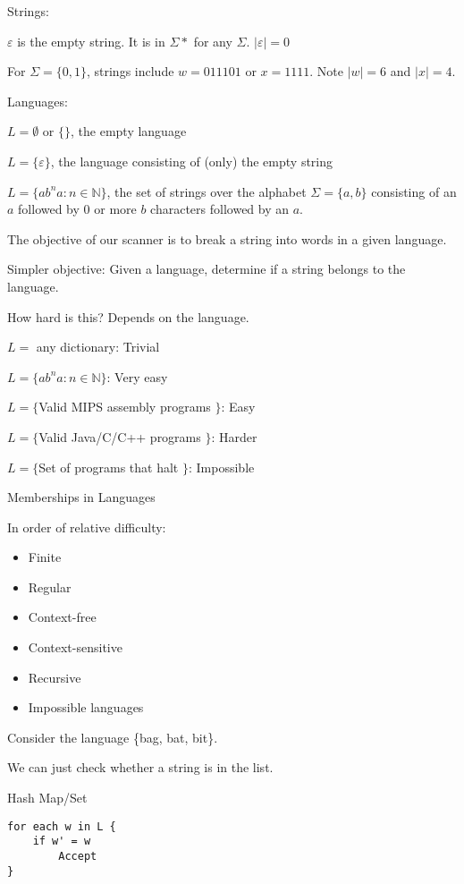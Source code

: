 \documentclass{article}
\begin{document}
Strings:

\(\varepsilon\) is the empty string. It is in \(\Sigma*\) for any
\(\Sigma\). \(|\varepsilon| = 0\)

For \(\Sigma = \{0,1\}\), strings include \(w = 011101\) or
\(x = 1111\). Note \(|w| = 6\) and \(|x| = 4\).

Languages:

\(L = \emptyset\) or \(\{\}\), the empty language

\(L = \{\varepsilon\}\), the language consisting of (only) the empty
string

\(L = \{ab^na: n \in \mathbb{N}\}\), the set of strings over the
alphabet \(\Sigma = \{a,b\}\) consisting of an \(a\) followed by \(0\)
or more \(b\) characters followed by an \(a\).

The objective of our scanner is to break a string into words in a given
language.

Simpler objective: Given a language, determine if a string belongs to
the language.

How hard is this? Depends on the language.

\(L =\) any dictionary: Trivial

\(L = \{ab^na: n \in \mathbb{N}\}\): Very easy

\(L = \{\)Valid MIPS assembly programs \(\}\): Easy

\(L = \{\)Valid Java/C/C++ programs \(\}\): Harder

\(L = \{\)Set of programs that halt \(\}\): Impossible

Memberships in Languages

In order of relative difficulty:
\begin{itemize}
    \item Finite
    \item Regular
    \item Context-free
    \item Context-sensitive
    \item Recursive
    \item Impossible languages
\end{itemize}

Consider the language \{bag, bat, bit\}.

We can just check whether a string is in the list.


Hash Map/Set

\begin{tcolorbox}
\begin{verbatim}
for each w in L {
    if w' = w
        Accept
}
\end{verbatim}
\end{tcolorbox}
\end{document}
